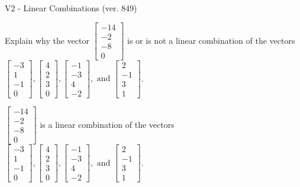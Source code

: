 \begin{exercise}
  \begin{exerciseTitle}V2 - Linear Combinations (ver. 849)\end{exerciseTitle}
  \begin{exerciseStatement}
    Explain why the vector \(\left[\begin{array}{c}
-14 \\
-2 \\
-8 \\
0
\end{array}\right]\)  is or is not a linear 
	combination of the vectors \(\left[\begin{array}{c}
-3 \\
1 \\
-1 \\
0
\end{array}\right] , \left[\begin{array}{c}
4 \\
2 \\
3 \\
0
\end{array}\right] , \left[\begin{array}{c}
-1 \\
-3 \\
4 \\
-2
\end{array}\right] , \text{ and } \left[\begin{array}{c}
2 \\
-1 \\
3 \\
1
\end{array}\right]\).
	


  \end{exerciseStatement}
  \begin{exerciseAnswer}
   \(\left[\begin{array}{c}
-14 \\
-2 \\
-8 \\
0
\end{array}\right]\) 
  	 is  
	a linear combination of the vectors \(\left[\begin{array}{c}
-3 \\
1 \\
-1 \\
0
\end{array}\right] , \left[\begin{array}{c}
4 \\
2 \\
3 \\
0
\end{array}\right] , \left[\begin{array}{c}
-1 \\
-3 \\
4 \\
-2
\end{array}\right] , \text{ and } \left[\begin{array}{c}
2 \\
-1 \\
3 \\
1
\end{array}\right]\).


\end{exerciseAnswer}
\end{exercise}
